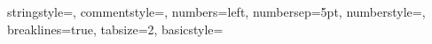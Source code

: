 {%
%
  stringstyle=\color{arduinoDarkBlue},    
  commentstyle=\color{arduinoGrey},    
%          
%   
   numbers=left,                    
  numbersep=5pt,                   
  numberstyle=\color{arduinoGrey},    
%
%
  breaklines=true,                    %
  tabsize=2,         
  basicstyle=\ttfamily  
}